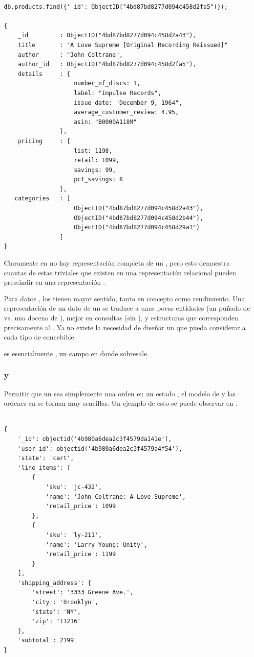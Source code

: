 \medskip
\begin{lstlisting}[caption= Busqueda en MongoDB, label=source:javascript:example_search_mongodb]

db.products.find({'_id': ObjectID("4bd87bd8277d094c458d2fa5")});

{
	_id			: ObjectID("4bd87bd8277d094c458d2a43"),
	title		: "A Love Supreme [Original Recording Reissued]"
	author		: "John Coltrane",
	author_id	: ObjectID("4bd87bd8277d094c458d2fa5"),
	details		: {
					number_of_discs: 1,
					label: "Impulse Records",
   					issue_date: "December 9, 1964",
   					average_customer_review: 4.95,
   					asin: "B0000A118M"
   				},
   	pricing		: {
   					list: 1198,
   					retail: 1099,
   					savings: 99,
   					pct_savings: 8
   				},
   categories	: [
   					ObjectID("4bd87bd8277d094c458d2a43"),
   					ObjectID("4bd87bd8277d094c458d2b44"), 
   					ObjectID("4bd87bd8277d094c458d29a1")
   				]
}
\end{lstlisting}

Claramente en  no hay  representación completa de un \itemCOM, pero esto demuestra cuantas de estas \tablesDB triviales que existen en una representación relacional pueden prescindir en una representación \documentDB.

Para datos \objectOriented, los \documentsDB tienen mayor sentido, tanto en concepto como rendimiento. Una representación \documentOriented de un dato de un \itemCOM se traduce a unas pocas entidades (un puñado de \collectionsDB vs. una docena de \tablesDB), mejor \performanceQA en consultas (sin \serverSide \joins), y estructuras que corresponden precisamente al \itemCOM. Ya no existe la necesidad de diseñar un \masterSchema que pueda considerar a cada tipo de \itemCOM concebible.

\catalogManagement es esencialmente \contentManagement, un campo en donde \mongodbNAME sobresale.

\subsubsection{\shoppingCarts y \ordersCommerce}

Permitir que un \shoppingCarts sea simplemente una orden en un estado  \cartCOM, el modelo de \shoppingCarts y las ordenes en \mongodbNAME se tornan muy sencillas. Un ejemplo de esto se puede observar en  .

\medskip
\begin{lstlisting}[caption= Estructura de una \orderCommerce., label=source:javascript:example_schema_order]

{
	'_id': objectid('4b980a6dea2c3f4579da141e'),
	'user_id': objectid('4b980a6dea2c3f4579a4f54'),
	'state': 'cart',
	'line_items': [
		{
			'sku': 'jc-432',
			'name': 'John Coltrane: A Love Supreme',
			'retail_price': 1099
		},
		{
			'sku': 'ly-211',
			'name': 'Larry Young: Unity',
			'retail_price': 1199
		}
	],
	'shipping_address': {
		'street': '3333 Greene Ave.',
		'city': 'Brooklyn',
		'state': 'NY',
		'zip': '11216'
	},
	'subtotal': 2199
}
\end{lstlisting}

